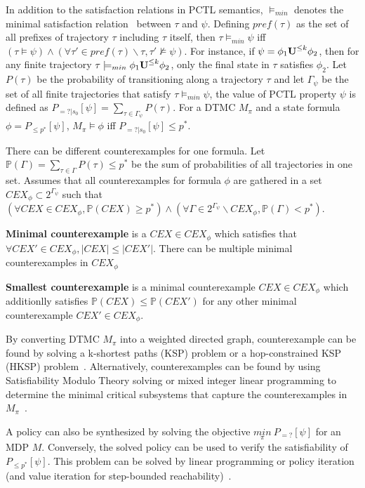 In addition to the satisfaction relations in PCTL semantics, $\models_{min}$ denotes the minimal satisfaction relation~\cite{4770111} between $\tau$ and $\psi$. Defining $pref(\tau)$ as the set of all prefixes of trajectory $\tau$ including $\tau$ itself, then $\tau\models_{min} \psi$ iff $(\tau\models\psi) \wedge (\forall \tau'\in pref(\tau)\backslash\tau, \tau' \nvDash \psi)$. For instance, if $\psi=\phi_1 {\textbf{U}}^{\leq k}\phi_2$, then for any finite trajectory $\tau\models_{min}\phi_1 {\textbf{U}}^{\leq k}\phi_2$, only the final state in $\tau$ satisfies $\phi_2$. Let $P(\tau)$ be the probability of transitioning along a trajectory $\tau$ and let $\Gamma_\psi$ be the set of all finite trajectories that satisfy $\tau\models_{min}\psi$, the value of PCTL property $\psi$ is defined as $P_{=?|s_0}[\psi]=\sum\limits_{\tau\in\Gamma_\psi}P(\tau)$. For a DTMC $M_{\pi}$ and a state formula $\phi= P_{\leq p^*}[\psi]$, $M_{\pi} \models \phi$ iff $P_{=?|s_0}[\psi]\leq p^*$. 

There can be different counterexamples for one formula. Let $\mathbb{P}(\Gamma) = \sum_{\tau\in \Gamma}P(\tau)\leq p^*$ be the sum of probabilities of all trajectories in one set. Assumes that all counterexamples for formula $\phi$ are gathered in a set $CEX_{\phi}\subset 2^{\Gamma_\psi}$ such that $(\forall CEX\in CEX_{\phi},\mathbb{P}(CEX)\geq p^*) \wedge (\forall \Gamma\in 2^{\Gamma_\psi}\backslash CEX_{\phi}, \mathbb{P}(\Gamma)< p^*)$. 

\begin{definition}
\textbf{Minimal counterexample} is a $CEX\in CEX_{\phi}$ which satisfies that $\forall CEX'\in CEX_{\phi}, |CEX|\leq|CEX'|$. There can be multiple minimal counterexamples in $CEX_{\phi}$
\end{definition}

\begin{definition}
\textbf{Smallest counterexample} is a minimal counterexample $CEX\in CEX_{\phi}$ which additionlly satisfies $\mathbb{P}(CEX)\leq \mathbb{P}(CEX')$ for any other minimal counterexample $CEX'\in CEX_{\phi}$.
\end{definition}

By converting DTMC $M_\pi$ into a weighted directed graph, counterexample can be found by solving a k-shortest paths (KSP) problem or 
a hop-constrained KSP (HKSP) problem~\cite{4770111}. 
Alternatively, counterexamples can be found by using Satisfiability Modulo Theory solving or mixed integer linear programming to 
determine the minimal critical subsystems that capture the counterexamples in $M_\pi$~\cite{Wimmer2012}. 

A policy can also be synthesized by solving the objective $\underset{\pi}{min}\ P_{=?}[\psi]$ for an MDP $M$. Conversely, the solved policy can be used to verify the satisfiability of $P_{\leq p^*}[\psi]$. 
This problem can be solved by linear programming or policy iteration (and value iteration for step-bounded reachability)~\cite{Kwiatkowska2013}.




